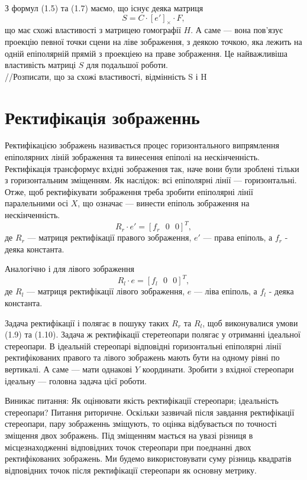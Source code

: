 З формул (1.5) та (1.7) маємо, що існує деяка матриця
\begin{equation}
S = C \cdot {[e']}_\times \cdot F,
\end{equation}
що має схожі властивості з матрицею гомографії $H$. А саме --- вона пов'язує 
проекцію певної точки сцени на ліве зображення, з деякою точкою, яка лежить на 
одній епіполярній прямій з проекціею на праве зображення. Це найважливіша 
властивість матриці $S$ для подальшої роботи.
\\//Розписати, що за схожі властивості, відмінність S і H\\


\section{Ректифікація зображеннь}
Ректифікацією зображень називається процес горизонтального випрямлення 
епіполярних ліній зображення та винесення епіполі на нескінченність.
Ректифікація трансформує вхідні зображення так, наче вони були зроблені 
тільки з горизонтальним зміщенням. Як наслідок: всі епіполярні лінії --- 
горизонтальні. Отже, щоб ректифікувати зображення треба зробити 
епіполярні лінії паралельними осі $X$, що означає  --- винести епіполь 
зображення на нескінченність.
\begin{equation}
	R_r \cdot e' = {[f_r \:\:\: 0 \:\:\: 0]}^T,
\end{equation}
де $R_r$ --- матриця ректифікації правого зображення, $e'$ --- права епіполь, а 
$f_r$ - деяка константа.

Аналогічно і для лівого зображення
\begin{equation}
	R_l \cdot e = {[f_l \:\:\: 0 \:\:\: 0]}^T,
\end{equation}
де $R_l$ --- матриця ректифікації лівого зображення, $e$ --- ліва епіполь, а 
$f_l$ - деяка константа.

Задача ректифікації і полягає в пошуку таких $R_r$ та $R_l$, щоб виконувалися 
умови (1.9) та (1.10). Задача ж ректифікації стеретеопари полягає у отриманні 
ідеальної стереопари. В ідеальній стереопарі відповідні горизонтальні 
епіполярні лінії ректифікованих правого та лівого зображень мають бути на 
одному рівні по вертикалі. А саме --- мати однакові $Y$ координати. Зробити 
з вхідної стереопари ідеальну --- головна задача цієї роботи.

Виникає питання: Як оцінювати якість ректифікації стереопари; ідеальність 
стереопари? Питання риторичне. Оскільки зазвичай після завдання ректифікації 
стереопари, пару зображеннь зміщують, то оцінка відбувається по точності 
зміщення двох зображень. Під зміщенням мається на увазі різниця в 
місцезнаходженні відповідних точок стереопари при поеднанні двох 
ректифікованих зображень. Ми будемо використовувати суму різниць квадратів 
відповідних точок після ректифікації стереопари як основну метрику.



